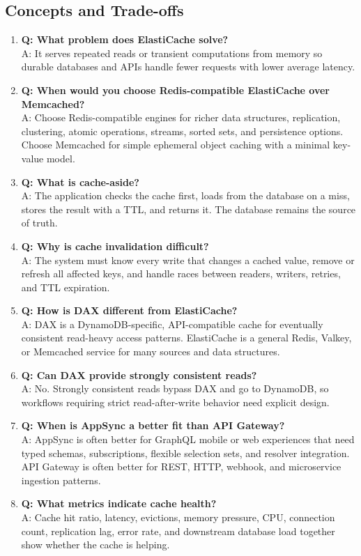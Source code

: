 \subsection{Concepts and Trade-offs}
\begin{enumerate}
    \item \textbf{Q: What problem does ElastiCache solve?}\\
    A: It serves repeated reads or transient computations from memory so durable databases and APIs handle fewer requests with lower average latency.
    \item \textbf{Q: When would you choose Redis-compatible ElastiCache over Memcached?}\\
    A: Choose Redis-compatible engines for richer data structures, replication, clustering, atomic operations, streams, sorted sets, and persistence options. Choose Memcached for simple ephemeral object caching with a minimal key-value model.
    \item \textbf{Q: What is cache-aside?}\\
    A: The application checks the cache first, loads from the database on a miss, stores the result with a TTL, and returns it. The database remains the source of truth.
    \item \textbf{Q: Why is cache invalidation difficult?}\\
    A: The system must know every write that changes a cached value, remove or refresh all affected keys, and handle races between readers, writers, retries, and TTL expiration.
    \item \textbf{Q: How is DAX different from ElastiCache?}\\
    A: DAX is a DynamoDB-specific, API-compatible cache for eventually consistent read-heavy access patterns. ElastiCache is a general Redis, Valkey, or Memcached service for many sources and data structures.
    \item \textbf{Q: Can DAX provide strongly consistent reads?}\\
    A: No. Strongly consistent reads bypass DAX and go to DynamoDB, so workflows requiring strict read-after-write behavior need explicit design.
    \item \textbf{Q: When is AppSync a better fit than API Gateway?}\\
    A: AppSync is often better for GraphQL mobile or web experiences that need typed schemas, subscriptions, flexible selection sets, and resolver integration. API Gateway is often better for REST, HTTP, webhook, and microservice ingestion patterns.
    \item \textbf{Q: What metrics indicate cache health?}\\
    A: Cache hit ratio, latency, evictions, memory pressure, CPU, connection count, replication lag, error rate, and downstream database load together show whether the cache is helping.
\end{enumerate}
